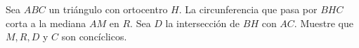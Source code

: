 \begin{problem}
    Sea $ABC$ un tri\'angulo con ortocentro $H$. La circunferencia que pasa por $BHC$ corta a la mediana $AM$ en $R$. Sea $D$ 
    la intersecci\'on de $BH$ con $AC$. Muestre que $M,R,D$ y $C$ son conc\'iclicos.

    \label{24JALTSTAC33}
\end{problem}